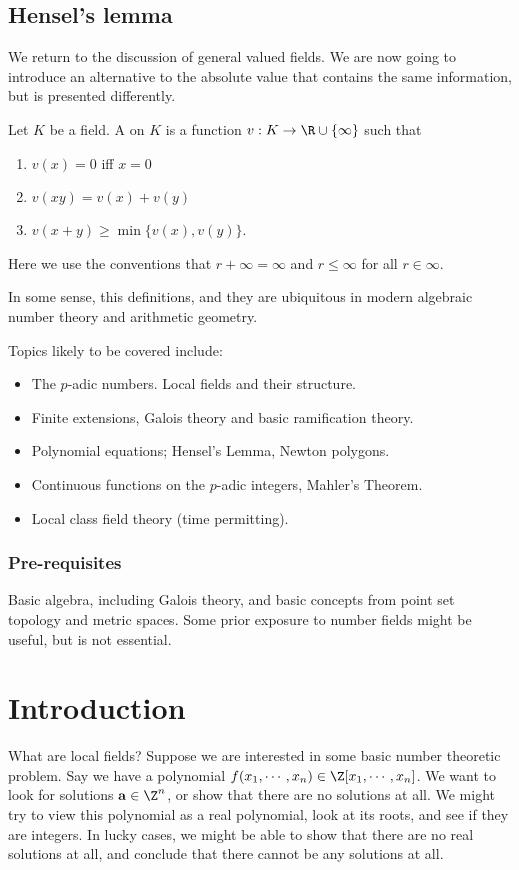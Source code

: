 \documentclass[a4paper]{article}
\begin{document}
\subsection{Hensel's lemma}
We return to the discussion of general valued fields. We are now going to introduce an alternative to the absolute value that contains the same information, but is presented differently.
\begin{defi}[Valuation]
  Let $K$ be a field. A  on $K$ is a function $v: K \to \R \cup \{\infty\}$ such that
  \begin{enumerate}
    \item $v(x) = 0$ iff $x = 0$
    \item $v(xy) = v(x) + v(y)$
    \item $v(x + y) \geq \min\{v(x), v(y)\}$.
  \end{enumerate}
\end{defi}
Here we use the conventions that $r + \infty = \infty$ and $r \leq \infty$ for all $r \in \infty$.

In some sense, this definitions, and they are ubiquitous in modern algebraic number theory and arithmetic geometry.

Topics likely to be covered include:
\begin{itemize}[label={}]
  \item The $p$-adic numbers. Local fields and their structure.
  \item Finite extensions, Galois theory and basic ramification theory.
  \item Polynomial equations; Hensel's Lemma, Newton polygons.
  \item Continuous functions on the $p$-adic integers, Mahler's Theorem.
  \item Local class field theory (time permitting).
\end{itemize}

\subsubsection*{Pre-requisites}
Basic algebra, including Galois theory, and basic concepts from point set topology and metric spaces. Some prior exposure to number fields might be useful, but is not essential.

\tableofcontents
\setcounter{section}{-1}
\section{Introduction}
What are local fields? Suppose we are interested in some basic number theoretic problem. Say we have a polynomial $f(x_1, \cdots, x_n) \in \Z[x_1, \cdots, x_n]$. We want to look for solutions $\mathbf{a} \in \Z^n$, or show that there are no solutions at all. We might try to view this polynomial as a real polynomial, look at its roots, and see if they are integers. In lucky cases, we might be able to show that there are no real solutions at all, and conclude that there cannot be any solutions at all.
\end{document}
